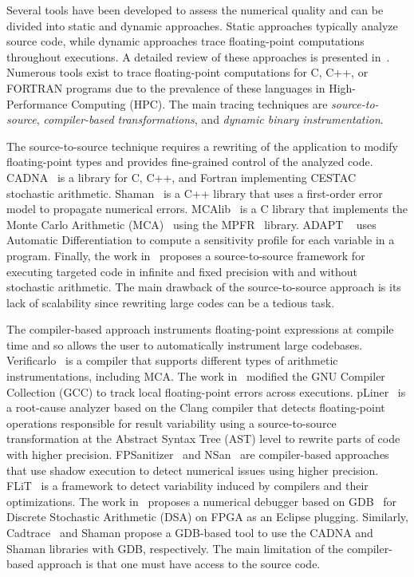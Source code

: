 \documentclass[10pt,journal,compsoc]{IEEEtran}
\begin{document}
Several tools have been developed to assess the numerical quality and can be
divided into static and dynamic approaches. Static approaches typically analyze
source code, while dynamic approaches trace floating-point computations
throughout executions. A detailed review of these approaches is presented
in~\cite{cherubin2020tools}.
Numerous tools exist to trace floating-point computations for C, C++, or FORTRAN
programs due to the prevalence of these languages in High-Performance Computing
(HPC). The main tracing techniques are \textit{source-to-source},
\textit{compiler-based transformations}, and \textit{dynamic binary
    instrumentation}.

The source-to-source technique requires a rewriting of the application to modify
floating-point types and provides fine-grained control of the analyzed code.
CADNA~\cite{jezequel2008cadna} is a library for C, C++, and Fortran implementing
CESTAC~\cite{vignes1993stochastic} stochastic arithmetic.
Shaman~\cite{demeure_phd} is a C++ library that uses a first-order error model
to propagate numerical errors. MCAlib~\cite{frechtling2015mcalib} is a C library
that implements the Monte Carlo Arithmetic (MCA)~\cite{parker1997monte} using
the MPFR~\cite{fousse2007mpfr} library. ADAPT \mbox{~\cite{menon2018adapt}} uses
Automatic Differentiation to compute a sensitivity profile for each variable in
a program. Finally, the work in~\cite{tang2016software} proposes a
source-to-source framework for executing targeted code in infinite and fixed
precision with and without stochastic arithmetic. The main drawback of the
source-to-source approach is its lack of scalability since rewriting large codes
can be a tedious task.

The compiler-based approach instruments floating-point expressions at compile
time and so allows the user to automatically instrument large codebases.
Verificarlo~\cite{verificarlo} is a compiler that supports different types of
arithmetic instrumentations, including MCA. The work in~\cite{bao2013fly}
modified the GNU Compiler Collection (GCC) to track local floating-point errors
across executions. pLiner~\cite{guo2020pliner} is a root-cause analyzer based on
the Clang compiler that detects floating-point operations responsible for result
variability using a source-to-source transformation at the Abstract Syntax Tree
(AST) level to rewrite parts of code with higher precision.
FPSanitizer~\cite{chowdhary2020debugging,chowdhary2021parallel} and
NSan~\mbox{\cite{courbet2021nsan}} are compiler-based approaches that use shadow
execution to detect numerical issues using higher precision.
FLiT~\cite{sawaya2017flit} is a framework to detect variability induced by
compilers and their optimizations. The work in~\cite{wang2012development}
proposes a numerical debugger based on GDB~\cite{stallman1988debugging} for
Discrete Stochastic Arithmetic (DSA) on FPGA as an Eclipse plugging. Similarly,
Cadtrace~\cite{jezequel2008cadna} and Shaman propose a GDB-based tool to use the
CADNA and Shaman libraries with GDB, respectively. The main limitation of the
compiler-based approach is that one must have access to the source code.
\end{document}
